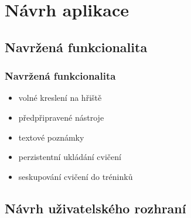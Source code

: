 \documentclass{beamer}
\begin{document}
\section{Návrh aplikace}

\subsection{Navržená funkcionalita}

\begin{frame}
  \frametitle{Navržená funkcionalita}

  \begin{itemize}
    \item volné kreslení na hřiště
    \item předpřipravené nástroje
    \item textové poznámky
    \item perzistentní ukládání cvičení
    \item seskupování cvičení do tréninků
  \end{itemize}
\end{frame}


\subsection{Návrh uživatelského rozhraní}
\end{document}
